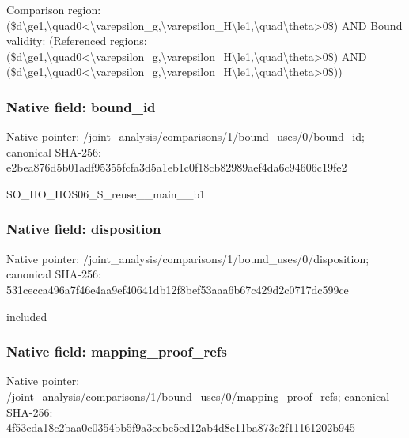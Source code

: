 \documentclass[10pt,a4paper]{article}
\begin{document}
\begingroup\raggedright\sloppy Comparison region:\allowbreak{} (\$d\textbackslash{}ge1,\allowbreak{}\textbackslash{}quad0<\textbackslash{}varepsilon\_\allowbreak{}g,\allowbreak{}\textbackslash{}varepsilon\_\allowbreak{}H\textbackslash{}le1,\allowbreak{}\textbackslash{}quad\textbackslash{}theta>0\$) AND Bound validity:\allowbreak{} (Referenced regions:\allowbreak{} (\$d\textbackslash{}ge1,\allowbreak{}\textbackslash{}quad0<\textbackslash{}varepsilon\_\allowbreak{}g,\allowbreak{}\textbackslash{}varepsilon\_\allowbreak{}H\textbackslash{}le1,\allowbreak{}\textbackslash{}quad\textbackslash{}theta>0\$) AND (\$d\textbackslash{}ge1,\allowbreak{}\textbackslash{}quad0<\textbackslash{}varepsilon\_\allowbreak{}g,\allowbreak{}\textbackslash{}varepsilon\_\allowbreak{}H\textbackslash{}le1,\allowbreak{}\textbackslash{}quad\textbackslash{}theta>0\$))\par\endgroup

\subsubsection{Native field: bound\_\allowbreak{}id}
Native pointer: /joint\_\allowbreak{}analysis/comparisons/1/bound\_\allowbreak{}uses/0/bound\_\allowbreak{}id; canonical SHA-256: e2bea876d5b01adf95355fcfa3d5a1eb1c0f18cb82989aef4da6c94606c19fe2

\begingroup\raggedright\sloppy SO\_\allowbreak{}HO\_\allowbreak{}HOS06\_\allowbreak{}S\_\allowbreak{}reuse\_\allowbreak{}\_\allowbreak{}main\_\allowbreak{}\_\allowbreak{}b1\par\endgroup

\subsubsection{Native field: disposition}
Native pointer: /joint\_\allowbreak{}analysis/comparisons/1/bound\_\allowbreak{}uses/0/disposition; canonical SHA-256: 531cecca496a7f46e4aa9ef40641db12f8bef53aaa6b67c429d2c0717dc599ce

\begingroup\raggedright\sloppy included\par\endgroup

\subsubsection{Native field: mapping\_\allowbreak{}proof\_\allowbreak{}refs}
Native pointer: /joint\_\allowbreak{}analysis/comparisons/1/bound\_\allowbreak{}uses/0/mapping\_\allowbreak{}proof\_\allowbreak{}refs; canonical SHA-256: 4f53cda18c2baa0c0354bb5f9a3ecbe5ed12ab4d8e11ba873c2f11161202b945
\end{document}
